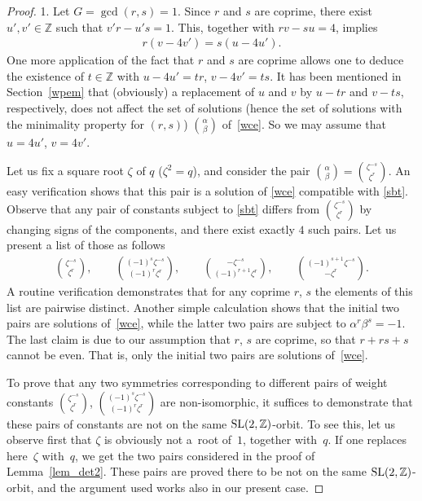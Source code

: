 \documentclass[pdftex]{sigma}
\numberwithin{equation}{section}
\begin{document}
\begin{proof} 1. Let $G=\operatorname{gcd}(r,s)=1$. Since $r$ and $s$ are coprime, there exist $u',v'\in\mathbb{Z}$ such that $v'r-u's=1$. This, together with $rv-su=4$, implies
\begin{gather*}r(v-4v')=s(u-4u').\end{gather*}
One more application of the fact that $r$ and $s$ are coprime allows one to deduce the existence of $t\in\mathbb{Z}$ with $u-4u'=tr$, $v-4v'=ts$. It has been mentioned in Section~\ref{wpem} that (obviously) a replacement of $u$ and $v$ by $u-tr$ and $v-ts$, respectively, does not affect the set of solutions (hence the set of solutions with the minimality property for $(r,s)$) $\binom{\alpha}{\beta}$ of~\eqref{wce}. So we may assume that $u=4u'$, $v=4v'$.

Let us fix a square root $\zeta$ of $q$ ($\zeta^2=q$), and consider the pair $\binom{\alpha}{\beta}=\binom{\zeta^{-s}}{\zeta^r}$. An easy verification shows that this pair is a solution of \eqref{wce} compatible with \eqref{sbt}. Observe that any pair of constants subject to \eqref{sbt} differs from $\binom{\zeta^{-s}}{\zeta^r}$ by changing signs of the components, and there exist exactly $4$ such pairs. Let us present a list of those as follows
\begin{gather*}
\binom{\zeta^{-s}}{\zeta^r},\qquad\binom{(-1)^s\zeta^{-s}}{(-1)^r\zeta^r}, \qquad\binom{-\zeta^{-s}}{(-1)^{r+1}\zeta^r},\qquad
\binom{(-1)^{s+1}\zeta^{-s}}{-\zeta^r}.
\end{gather*}
A routine verification demonstrates that for any coprime $r$, $s$ the elements of this list are pairwise distinct. Another simple calculation shows that the initial two pairs are solutions of~\eqref{wce}, while the latter two pairs are subject to $\alpha^r\beta^s=-1$. The last claim is due to our assumption that $r$, $s$ are coprime, so that $r+rs+s$ cannot be even. That is, only the initial two pairs are solutions of~\eqref{wce}.

To prove that any two symmetries corresponding to different pairs of weight constants $\binom{\zeta^{-s}}{\zeta^r}$, $\binom{(-1)^s\zeta^{-s}}{(-1)^r\zeta^r}$ are non-isomorphic, it suffices to demonstrate that these pairs of constants are not on the same ${\rm SL}(2,\mathbb{Z})$-orbit. To see this, let us observe first that $\zeta$ is obviously not a~root of~$1$, together with~$q$. If one replaces here~$\zeta$ with~$q$, we get the two pairs considered in the proof of Lemma~\ref{lem_det2}. These pairs are proved there to be not on the same ${\rm SL}(2,\mathbb{Z})$-orbit, and the argument used works also in our present case.


\end{proof}
\end{document}
